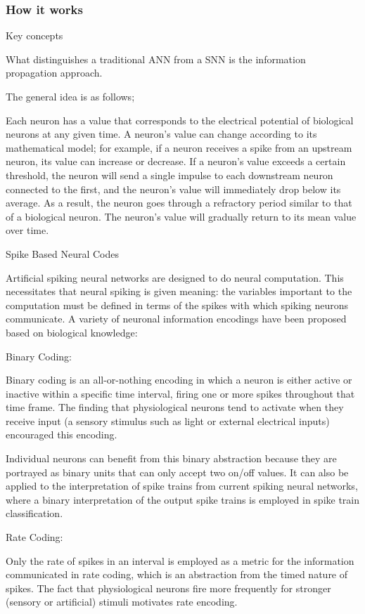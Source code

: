 \documentclass{article}
\begin{document}
\subsubsection{How it works}
{\color{blue}
  Key concepts

  What distinguishes a traditional ANN from a SNN is the information propagation approach.

  The general idea is as follows;

  Each neuron has a value that corresponds to the electrical potential of biological neurons at any given time.
  A neuron's value can change according to its mathematical model; for example, if a neuron receives a spike from an upstream neuron, its value can increase or decrease.
  If a neuron's value exceeds a certain threshold, the neuron will send a single impulse to each downstream neuron connected to the first, and the neuron's value will immediately drop below its average.
  As a result, the neuron goes through a refractory period similar to that of a biological neuron. The neuron's value will gradually return to its mean value over time.

  Spike Based Neural Codes

  Artificial spiking neural networks are designed to do neural computation. This necessitates that neural spiking is given meaning: the variables important to the computation must be defined in terms of the spikes with which spiking neurons communicate. A variety of neuronal information encodings have been proposed based on biological knowledge:

  Binary Coding:

  Binary coding is an all-or-nothing encoding in which a neuron is either active or inactive within a specific time interval, firing one or more spikes throughout that time frame. The finding that physiological neurons tend to activate when they receive input (a sensory stimulus such as light or external electrical inputs) encouraged this encoding.

  Individual neurons can benefit from this binary abstraction because they are portrayed as binary units that can only accept two on/off values. It can also be applied to the interpretation of spike trains from current spiking neural networks, where a binary interpretation of the output spike trains is employed in spike train classification.

  Rate Coding:

  Only the rate of spikes in an interval is employed as a metric for the information communicated in rate coding, which is an abstraction from the timed nature of spikes. The fact that physiological neurons fire more frequently for stronger (sensory or artificial) stimuli motivates rate encoding.

}
\end{document}
